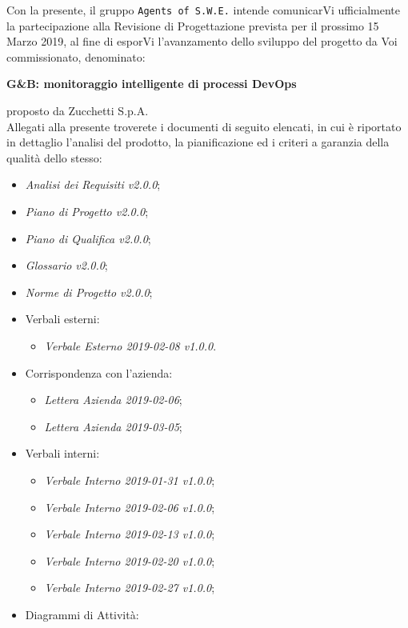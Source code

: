 \documentclass[11pt, a4paper]{letter} %
\begin{document}
\begin{letter}
		Con la presente, il gruppo \texttt{Agents of S.W.E.} intende comunicarVi ufficialmente la partecipazione alla Revisione di Progettazione prevista per il prossimo 15 Marzo 2019, al fine di esporVi l'avanzamento dello sviluppo del progetto da Voi commissionato, denominato:
		\begin{center}
			\textbf{G\&B: monitoraggio intelligente di processi DevOps}
		\end{center}
		proposto da Zucchetti S.p.A.\\
		Allegati alla presente troverete i documenti di seguito elencati, in cui è riportato in dettaglio l'analisi del prodotto, la pianificazione ed i criteri a garanzia della qualità dello stesso:
		\begin{itemize}
			\item \textit{Analisi dei Requisiti v2.0.0};
			\item  \textit{Piano di Progetto v2.0.0};
			\item \textit{Piano di Qualifica v2.0.0};
			\item \textit{Glossario v2.0.0};
			\item \textit{Norme di Progetto v2.0.0};	
			\item Verbali esterni: 
			\begin{itemize}
				\item \textit{Verbale Esterno 2019-02-08 v1.0.0}.
			\end{itemize}
			\item Corrispondenza con l'azienda: 
			\begin{itemize}
				\item \textit{Lettera Azienda 2019-02-06};
				\item \textit{Lettera Azienda 2019-03-05};
			\end{itemize}
			\item Verbali interni: 
			\begin{itemize}
				\item \textit{Verbale Interno 2019-01-31 v1.0.0};
				\item \textit{Verbale Interno 2019-02-06 v1.0.0};
				\item \textit{Verbale Interno 2019-02-13 v1.0.0};
				\item \textit{Verbale Interno 2019-02-20 v1.0.0};
				\item \textit{Verbale Interno 2019-02-27 v1.0.0};
			\end{itemize}
		\item Diagrammi di Attività: 
		\begin{itemize}

\end{itemize}
\end{itemize}
\end{letter}
\end{document}
